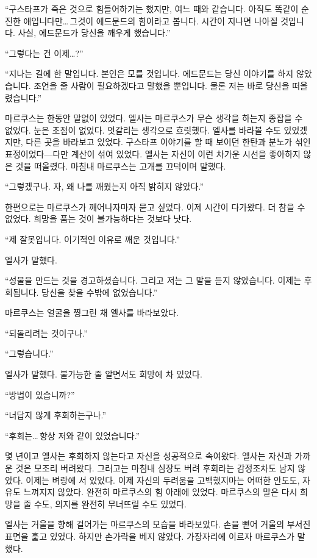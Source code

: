 ``구스타프가 죽은 것으로 힘들어하기는 했지만, 여느 때와 같습니다. 아직도 똑같이 순진한 애입니다만\ldots\,그것이 에드문드의 힘이라고 봅니다. 시간이 지나면 나아질 것입니다. 사실, 에드문드가 당신을 깨우게 했습니다.''

``그렇다는 건 이제\ldots?''

``지나는 길에 한 말입니다. 본인은 모를 것입니다. 에드문드는 당신 이야기를 하지 않았습니다. 조언을 줄 사람이 필요하겠다고 말했을 뿐입니다. 물론 저는 바로 당신을 떠올렸습니다.''

마르쿠스는 한동안 말없이 있었다. 엘사는 마르쿠스가 무슨 생각을 하는지 종잡을 수 없었다. 눈은 초점이 없었다. 엇갈리는 생각으로 흐릿했다. 엘사를 바라볼 수도 있었겠지만, 다른 곳을 바라보고 있었다. 구스타프 이야기를 할 때 보이던 한탄과 분노가 섞인 표정이었다—다만 계산이 섞여 있었다. 엘사는 자신이 이런 차가운 시선을 좋아하지 않은 것을 떠올렸다. 마침내 마르쿠스는 고개를 끄덕이며 말했다.

``그렇겠구나. 자, 왜 나를 깨웠는지 아직 밝히지 않았다.''

한편으로는 마르쿠스가 깨어나자마자 묻고 싶었다. 이제 시간이 다가왔다. 더 참을 수 없었다. 희망을 품는 것이 불가능하다는 것보다 낫다.

``제 잘못입니다. 이기적인 이유로 깨운 것입니다.''

엘사가 말했다.

``성물을 만드는 것을 경고하셨습니다. 그리고 저는 그 말을 듣지 않았습니다. 이제는 후회됩니다. 당신을 찾을 수밖에 없었습니다.''

마르쿠스는 얼굴을 찡그린 채 엘사를 바라보았다.

``되돌리려는 것이구나.''

``그렇습니다.''

엘사가 말했다. 불가능한 줄 알면서도 희망에 차 있었다.

``방법이 있습니까?''

``너답지 않게 후회하는구나.''

``후회는\ldots\,항상 저와 같이 있었습니다.''

몇 년이고 엘사는 후회하지 않는다고 자신을 성공적으로 속여왔다. 엘사는 자신과 가까운 것은 모조리 버려왔다. 그러고는 마침내 심장도 버려 후회라는 감정조차도 남지 않았다. 이제는 벼랑에 서 있었다. 이제 자신의 두려움을 고백했지마는 어떠한 안도도, 자유도 느껴지지 않았다. 완전히 마르쿠스의 힘 아래에 있었다. 마르쿠스의 말은 다시 희망을 줄 수도, 의지를 완전히 무너뜨릴 수도 있었다.

엘사는 거울을 향해 걸어가는 마르쿠스의 모습을 바라보았다. 손을 뻗어 거울의 부서진 표면을 훑고 있었다. 하지만 손가락을 베지 않았다. 가장자리에 이르자 마르쿠스가 말했다.

